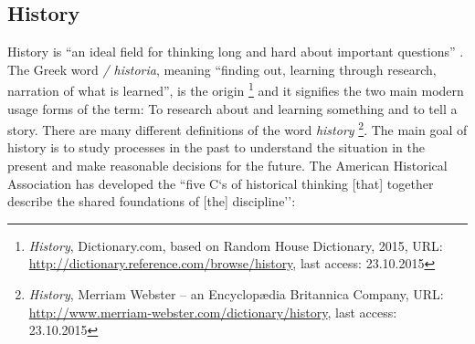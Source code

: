 \subsection{History} %
\label{sub:history}

History is ``an ideal field for thinking long and hard about important questions''
\cite{ahaFiveCs}.
The Greek word \emph{\textIota\textsigma\texttau\textomikron\textrho\textiota\textalpha / historia}, meaning ``finding out, learning through research, narration of what is learned'', is the origin
\footnote{
  \textit{History},
  Dictionary.com, based on Random House Dictionary, 2015,
  URL: \url{http://dictionary.reference.com/browse/history},
  last access: 23.10.2015
}
and it signifies the two main modern usage forms of the term: To research about and learning something and to tell a story. There are many different definitions of the word \emph{history}
\footnote{
  \textit{History},
  Merriam Webster -- an Encyclopædia Britannica Company,
  URL: \url{http://www.merriam-webster.com/dictionary/history},
  last access: 23.10.2015
}.
The main goal of history is to study processes in the past to understand the situation in the present and make reasonable decisions for the future. The American Historical Association has developed the ``five C`s of historical thinking [that] together describe the shared foundations of [the] discipline''\cite{ahaFiveCs}:

